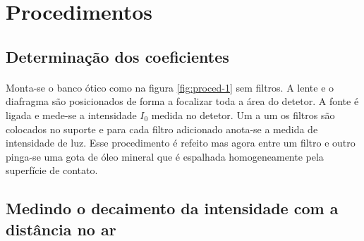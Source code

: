 \documentclass[a4paper,11pt]{article}
\begin{document}
\section{Procedimentos}
\subsection{Determinação dos coeficientes}
\paragraph{}Monta-se o banco ótico como na figura \ref{fig:proced-1} sem filtros. A lente e o diafragma são posicionados de forma a focalizar toda a área do detetor. A fonte é ligada e mede-se a intensidade $I_0$ medida no detetor. Um a um os filtros são colocados no suporte e para cada filtro adicionado anota-se a medida de intensidade de luz. Esse procedimento é refeito mas agora entre um filtro e outro pinga-se uma gota de óleo mineral que é espalhada homogeneamente pela superfície de contato.

\subsection{Medindo o decaimento da intensidade com a distância no ar}
\end{document}
